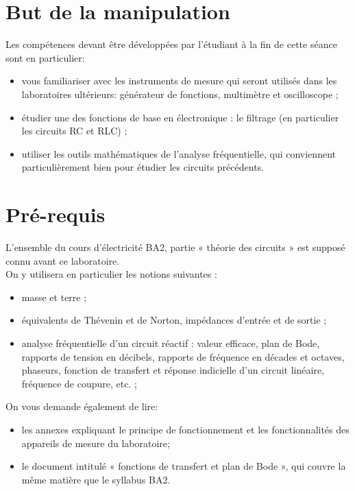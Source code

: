 \documentclass{../template/tp}
\author{The Fantastic Four} %
\begin{document}

\section{But de la manipulation}

Les compétences devant être développées par l'étudiant à la fin de cette séance sont en particulier:
\begin{itemize}
	\item vous familiariser avec les instruments de mesure qui seront utilisés dans les laboratoires ultérieurs: générateur de fonctions, multimètre et oscilloscope ;
	\item étudier une des fonctions de base en électronique : le filtrage (en particulier les circuits RC et RLC) ;
	\item utiliser les outils mathématiques de l'analyse fréquentielle, qui conviennent particulièrement bien pour étudier les
circuits précédents.
\end{itemize}

\section{Pré-requis}
L'ensemble du cours d'électricité BA2, partie « théorie des circuits » est supposé connu avant ce laboratoire.\\
On y utilisera en particulier les notions suivantes :
\begin{itemize}
\item masse et terre ; %
\item équivalents de Thévenin et de Norton, impédances d'entrée et de sortie ; %
\item analyse fréquentielle d'un circuit réactif : valeur efficace, plan de Bode, rapports de tension en
décibels, rapports de fréquence en décades et octaves, phaseurs, fonction de transfert et réponse indicielle d'un
circuit linéaire, fréquence de coupure, etc. ; %
\end{itemize}
On vous demande également de lire:
\begin{itemize}
\item les annexes expliquant le principe de fonctionnement et les fonctionnalités des appareils de mesure du laboratoire;
\item le document intitulé « fonctions de transfert et plan de Bode », qui couvre la même matière que le syllabus BA2.
\end{itemize}
\end{document}
